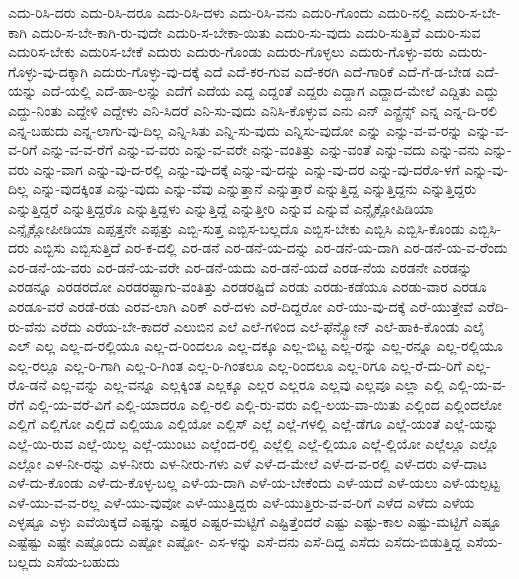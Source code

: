 {ಎದು-ರಿಸಿ-ದರು
ಎದು-ರಿಸಿ-ದರೂ
ಎದು-ರಿಸಿ-ದಳು
ಎದು-ರಿಸಿ-ವನು
ಎದುರಿ-ಗೊಂದು
ಎದುರಿ-ನಲ್ಲಿ
ಎದುರಿ-ಸ-ಬೇ-ಕಾಗಿ
ಎದುರಿ-ಸ-ಬೇ-ಕಾಗಿ-ರು-ವುದೇ
ಎದುರಿ-ಸ-ಬೇಕಾ-ಯಿತು
ಎದುರಿ-ಸು-ವುದು
ಎದುರಿ-ಸುತ್ತಿವೆ
ಎದುರಿ-ಸುವ
ಎದುರಿಸ-ಬೇಕು
ಎದುರಿಸ-ಬೇಕೆ
ಎದುರು
ಎದುರು-ಗೊಂಡು
ಎದುರು-ಗೊಳ್ಳಲು
ಎದುರು-ಗೊಳ್ಳು-ವರು
ಎದುರು-ಗೊಳ್ಳು-ವು-ದಕ್ಕಾಗಿ
ಎದುರು-ಗೊಳ್ಳು-ವು-ದಕ್ಕೆ
ಎದೆ
ಎದೆ-ಕರ-ಗುವ
ಎದೆ-ಕರಗಿ
ಎದೆ-ಗಾರಿಕೆ
ಎದೆ-ಗೆ-ಡ-ಬೇಡ
ಎದೆ-ಯನ್ನು
ಎದೆ-ಯಲ್ಲಿ
ಎದೆ-ಹಾ-ಲನ್ನು
ಎದೆಗೆ
ಎದೆಯ
ಎದ್ದ
ಎದ್ದಂತೆ
ಎದ್ದರು
ಎದ್ದಾಗ
ಎದ್ದಾದ-ಮೇಲೆ
ಎದ್ದಿತು
ಎದ್ದು
ಎದ್ದು-ನಿಂತು
ಎದ್ದೇಳಿ
ಎದ್ದೇಳು
ಎನಿ-ಸಿದರೆ
ಎನಿ-ಸು-ವುದು
ಎನಿಸಿ-ಕೊಳ್ಳುವ
ಎನು
ಎನ್
ಎನ್ಟ್ರೆನ್ಸ್
ಎನ್ನ
ಎನ್ನ-ದಿ-ರಲಿ
ಎನ್ನ-ಬಹುದು
ಎನ್ನ-ಲಾಗು-ವು-ದಿಲ್ಲ
ಎನ್ನಿ-ಸಿತು
ಎನ್ನಿ-ಸು-ವುದು
ಎನ್ನಿಸು-ವುದೋ
ಎನ್ನು
ಎನ್ನು-ವ-ವ-ರನ್ನು
ಎನ್ನು-ವ-ವ-ರಿಗೆ
ಎನ್ನು-ವ-ವ-ರೆಗೆ
ಎನ್ನು-ವ-ವರು
ಎನ್ನು-ವ-ವರೇ
ಎನ್ನು-ವಂತಿತ್ತು
ಎನ್ನು-ವಂತೆ
ಎನ್ನು-ವದು
ಎನ್ನು-ವನು
ಎನ್ನು-ವರು
ಎನ್ನು-ವಾಗ
ಎನ್ನು-ವು-ದ-ರಲ್ಲಿ
ಎನ್ನು-ವು-ದಕ್ಕೆ
ಎನ್ನು-ವು-ದನ್ನು
ಎನ್ನು-ವು-ದರ
ಎನ್ನು-ವು-ದರೊ-ಳಗೆ
ಎನ್ನು-ವು-ದಿಲ್ಲ
ಎನ್ನು-ವುದಕ್ಕಿಂತ
ಎನ್ನು-ವುದು
ಎನ್ನು-ವೆವು
ಎನ್ನುತ್ತಾನೆ
ಎನ್ನುತ್ತಾರೆ
ಎನ್ನುತ್ತಿದ್ದ
ಎನ್ನುತ್ತಿದ್ದನು
ಎನ್ನುತ್ತಿದ್ದರು
ಎನ್ನುತ್ತಿದ್ದರೆ
ಎನ್ನುತ್ತಿದ್ದರೊ
ಎನ್ನುತ್ತಿದ್ದಳು
ಎನ್ನುತ್ತಿದ್ದೆ
ಎನ್ನುತ್ತೀರಿ
ಎನ್ನುವ
ಎನ್ನುವೆ
ಎನ್ಸೈಕ್ಲೋಪಿಡಿಯಾ
ಎನ್ಸೈಕ್ಲೋಪೀಡಿಯಾ
ಎಪ್ಪತ್ತನೇ
ಎಪ್ಪತ್ತು
ಎಬ್ಬಿ-ಸುತ್ತ
ಎಬ್ಬಿಸ-ಬಲ್ಲದೊ
ಎಬ್ಬಿಸ-ಬೇಕು
ಎಬ್ಬಿಸಿ
ಎಬ್ಬಿಸಿ-ಕೊಂಡು
ಎಬ್ಬಿಸಿ-ದರು
ಎಬ್ಬಿಸು
ಎಬ್ಬಿಸುತ್ತಿದೆ
ಎರ-ಕ-ದಲ್ಲಿ
ಎರ-ಡನೆ
ಎರ-ಡನೆ-ಯ-ದನ್ನು
ಎರ-ಡನೆ-ಯ-ದಾಗಿ
ಎರ-ಡನೆ-ಯ-ವ-ರೆಂದು
ಎರ-ಡನೆ-ಯ-ವರು
ಎರ-ಡನೆ-ಯ-ವರೇ
ಎರ-ಡನೆ-ಯದು
ಎರ-ಡನೆ-ಯದೆ
ಎರಡ-ನೆಯ
ಎರಡನೇ
ಎರಡನ್ನು
ಎರಡನ್ನೂ
ಎರಡರದೋ
ಎರಡರಷ್ಟಾಗು-ವಂತಿತ್ತು
ಎರಡರಷ್ಟಿದೆ
ಎರಡು
ಎರಡು-ಕಡೆಯೂ
ಎರಡು-ವಾರ
ಎರಡೂ
ಎರಡೂ-ವರೆ
ಎರಡೆ-ರಡು
ಎರವ-ಲಾಗಿ
ಎರಿಕ್
ಎರೆ-ದಳು
ಎರೆ-ದಿದ್ದರೋ
ಎರೆ-ಯು-ವು-ದಕ್ಕೆ
ಎರೆ-ಯುತ್ತೇವೆ
ಎರೆದಿ-ರು-ವೆನು
ಎರೆದು
ಎರೆಯ-ಬೇ-ಕಾದರೆ
ಎಲುಬಿನ
ಎಲೆ
ಎಲೆ-ಗಳಿಂದ
ಎಲೆ-ಫೆನ್ಸ್ಟೋನ್
ಎಲೆ-ಹಾಕಿ-ಕೊಂಡು
ಎಲೈ
ಎಲ್
ಎಲ್ಲ
ಎಲ್ಲ-ದ-ರಲ್ಲಿಯೂ
ಎಲ್ಲ-ದ-ರಿಂದಲೂ
ಎಲ್ಲ-ದಕ್ಕೂ
ಎಲ್ಲ-ಬಿಟ್ಟ
ಎಲ್ಲ-ರನ್ನು
ಎಲ್ಲ-ರನ್ನೂ
ಎಲ್ಲ-ರಲ್ಲಿಯೂ
ಎಲ್ಲ-ರಲ್ಲೂ
ಎಲ್ಲ-ರಿ-ಗಾಗಿ
ಎಲ್ಲ-ರಿ-ಗಿಂತ
ಎಲ್ಲ-ರಿ-ಗಿಂತಲೂ
ಎಲ್ಲ-ರಿಂದಲೂ
ಎಲ್ಲ-ರಿಗೂ
ಎಲ್ಲ-ರೆ-ದು-ರಿಗೆ
ಎಲ್ಲ-ರೊ-ಡನೆ
ಎಲ್ಲ-ವನ್ನು
ಎಲ್ಲ-ವನ್ನೂ
ಎಲ್ಲಕ್ಕಿಂತ
ಎಲ್ಲಕ್ಕೂ
ಎಲ್ಲರ
ಎಲ್ಲರೂ
ಎಲ್ಲವು
ಎಲ್ಲವೂ
ಎಲ್ಲಾ
ಎಲ್ಲಿ
ಎಲ್ಲಿ-ಯ-ವ-ರೆಗೆ
ಎಲ್ಲಿ-ಯ-ವರೆ-ವಿಗೆ
ಎಲ್ಲಿ-ಯಾದರೂ
ಎಲ್ಲಿ-ರಲಿ
ಎಲ್ಲಿ-ರು-ವರು
ಎಲ್ಲಿ-ಲಯ-ವಾ-ಯಿತು
ಎಲ್ಲಿಂದ
ಎಲ್ಲಿಂದಲೋ
ಎಲ್ಲಿಗೆ
ಎಲ್ಲಿಗೋ
ಎಲ್ಲಿದೆ
ಎಲ್ಲಿಯೂ
ಎಲ್ಲಿಯೋ
ಎಲ್ಲಿಸ್
ಎಲ್ಲೆ
ಎಲ್ಲೆ-ಗಳಲ್ಲಿ
ಎಲ್ಲೆ-ಡೆಗೂ
ಎಲ್ಲೆ-ಯಂತೆ
ಎಲ್ಲೆ-ಯನ್ನು
ಎಲ್ಲೆ-ಯಿ-ರುವ
ಎಲ್ಲೆ-ಯಿಲ್ಲ
ಎಲ್ಲೆ-ಯುಂಟು
ಎಲ್ಲೆಂದ-ರಲ್ಲಿ
ಎಲ್ಲೆಲ್ಲಿ
ಎಲ್ಲೆ-ಲ್ಲಿಯೂ
ಎಲ್ಲೆ-ಲ್ಲಿಯೋ
ಎಲ್ಲೆಲ್ಲೂ
ಎಲ್ಲೊ
ಎಲ್ಲೋ
ಎಳ-ನೀ-ರನ್ನು
ಎಳ-ನೀರು
ಎಳ-ನೀರು-ಗಳು
ಎಳೆ
ಎಳೆ-ದ-ಮೇಲೆ
ಎಳೆ-ದ-ವ-ರಲ್ಲಿ
ಎಳೆ-ದರು
ಎಳೆ-ದಾಟ
ಎಳೆ-ದು-ಕೊಂಡು
ಎಳೆ-ದು-ಕೊಳ್ಳ-ಬಲ್ಲ
ಎಳೆ-ಯ-ದಾಗಿ
ಎಳೆ-ಯ-ಬೇಕೆಂದು
ಎಳೆ-ಯದೆ
ಎಳೆ-ಯಲು
ಎಳೆ-ಯಲ್ಪಟ್ಟ
ಎಳೆ-ಯು-ವ-ವ-ರಲ್ಲ
ಎಳೆ-ಯು-ವುವೋ
ಎಳೆ-ಯುತ್ತಿದ್ದರು
ಎಳೆ-ಯುತ್ತಿರು-ವ-ವ-ರಿಗೆ
ಎಳೆದ
ಎಳೆದು
ಎಳೆಯ
ಎಳ್ಳಷ್ಟೂ
ಎಳ್ಳು
ಎವೆಯಿಕ್ಕದೆ
ಎಷ್ಟನ್ನು
ಎಷ್ಟರ
ಎಷ್ಟರ-ಮಟ್ಟಿಗೆ
ಎಷ್ಟಿತ್ತೆಂದರೆ
ಎಷ್ಟು
ಎಷ್ಟು-ಕಾಲ
ಎಷ್ಟು-ಮಟ್ಟಿಗೆ
ಎಷ್ಟೂ
ಎಷ್ಟೆಷ್ಟು
ಎಷ್ಟೇ
ಎಷ್ಟೊಂದು
ಎಷ್ಟೋ
ಎಷ್ಟೋ-
ಎಸ-ಳನ್ನು
ಎಸೆ-ದನು
ಎಸೆ-ದಿದ್ದ
ಎಸೆದು
ಎಸೆದು-ಬಿಡುತ್ತಿದ್ದ
ಎಸೆಯ-ಬಲ್ಲದು
ಎಸೆಯ-ಬಹುದು
}
